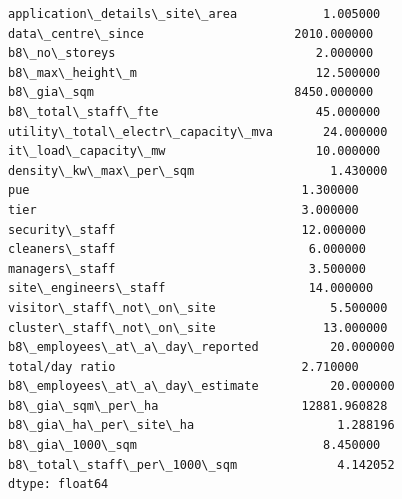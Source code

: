 \documentclass[11pt]{article}
\begin{document}
    \begin{Verbatim}[commandchars=\\\{\}]
application\_details\_site\_area            1.005000
data\_centre\_since                     2010.000000
b8\_no\_storeys                            2.000000
b8\_max\_height\_m                         12.500000
b8\_gia\_sqm                            8450.000000
b8\_total\_staff\_fte                      45.000000
utility\_total\_electr\_capacity\_mva       24.000000
it\_load\_capacity\_mw                     10.000000
density\_kw\_max\_per\_sqm                   1.430000
pue                                      1.300000
tier                                     3.000000
security\_staff                          12.000000
cleaners\_staff                           6.000000
managers\_staff                           3.500000
site\_engineers\_staff                    14.000000
visitor\_staff\_not\_on\_site                5.500000
cluster\_staff\_not\_on\_site               13.000000
b8\_employees\_at\_a\_day\_reported          20.000000
total/day ratio                          2.710000
b8\_employees\_at\_a\_day\_estimate          20.000000
b8\_gia\_sqm\_per\_ha                    12881.960828
b8\_gia\_ha\_per\_site\_ha                    1.288196
b8\_gia\_1000\_sqm                          8.450000
b8\_total\_staff\_per\_1000\_sqm              4.142052
dtype: float64
    \end{Verbatim}
\end{document}
